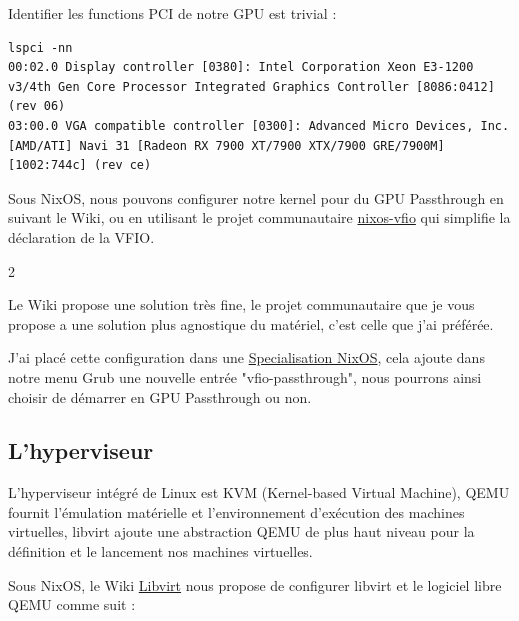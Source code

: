 \documentclass[a4paper,11pt]{article}
\begin{document}
\begin{blogmain}
Identifier les functions PCI de notre GPU est trivial :
\begin{lstlisting}
lspci -nn
00:02.0 Display controller [0380]: Intel Corporation Xeon E3-1200 v3/4th Gen Core Processor Integrated Graphics Controller [8086:0412] (rev 06)
03:00.0 VGA compatible controller [0300]: Advanced Micro Devices, Inc. [AMD/ATI] Navi 31 [Radeon RX 7900 XT/7900 XTX/7900 GRE/7900M] [1002:744c] (rev ce)
\end{lstlisting}

Sous NixOS, nous pouvons configurer notre kernel pour du GPU Passthrough en suivant le Wiki, ou en utilisant le projet communautaire \href{https://github.com/j-brn/nixos-vfio}{nixos-vfio} qui simplifie la déclaration de la VFIO.

\begin{multicols}{2}

\columnbreak

\end{multicols}

Le Wiki propose une solution très fine, le projet communautaire que je vous propose a une solution plus agnostique du matériel, c'est celle que j'ai préférée.

J'ai placé cette configuration dans une \href{https://wiki.nixos.org/wiki/Specialisation}{Specialisation NixOS}, cela ajoute dans notre menu Grub une nouvelle entrée "vfio-passthrough", nous pourrons ainsi choisir de démarrer en GPU Passthrough ou non.

\newpage
\subsection{L'hyperviseur}
L'hyperviseur intégré de Linux est KVM (Kernel-based Virtual Machine), QEMU fournit l’émulation matérielle et l’environnement d’exécution des machines virtuelles, libvirt ajoute une abstraction QEMU de plus haut niveau pour la définition et le lancement nos machines virtuelles.

Sous NixOS, le Wiki \href{https://nixos.wiki/wiki/Libvirt}{Libvirt} nous propose de configurer libvirt et le logiciel libre QEMU comme suit :


\end{blogmain}
\end{document}
